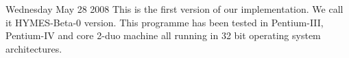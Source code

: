 Wednesday May 28 2008 
This is the first version of our implementation. We call it HYMES-Beta-0 version.
This programme has been tested in Pentium-III, Pentium-IV and core 2-duo machine all running in 32 bit operating system architectures. 
